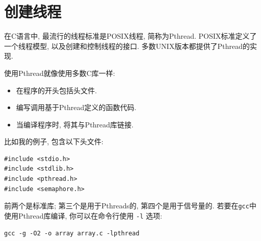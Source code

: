 \documentclass[12pt]{book}
\begin{document}
{%
\section{创建线程}

在C语言中, 最流行的线程标准是POSIX线程, 简称为Pthread. 
POSIX标准定义了一个线程模型, 以及创建和控制线程的接口. 
多数UNIX版本都提供了Pthread的实现.

使用Pthread就像使用多数C库一样:

\begin{itemize}

\item 在程序的开头包括头文件.

\item 编写调用基于Pthread定义的函数代码.

\item 当编译程序时, 将其与Pthread库链接. 

\end{itemize}

比如我的例子, 包含以下头文件: 

\begin{verbatim}
#include <stdio.h>
#include <stdlib.h>
#include <pthread.h>
#include <semaphore.h>
\end{verbatim}

前两个是标准库; 第三个是用于Pthreads的, 第四个是用于信号量的.
若要在{\tt gcc}中使用Pthread库编译, 你可以在命令行使用 {\tt -l} 选项:

\begin{verbatim}
gcc -g -O2 -o array array.c -lpthread
\end{verbatim}

}
\end{document}
